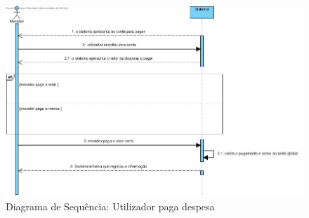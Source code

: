 \begin{figure}[htb!]
	\centering
	\includegraphics[scale=0.5]{imagens/DiagramaSeq/PagarDespesa}  
	\caption{Diagrama de Sequência: Utilizador paga despesa}  
\end{figure}


